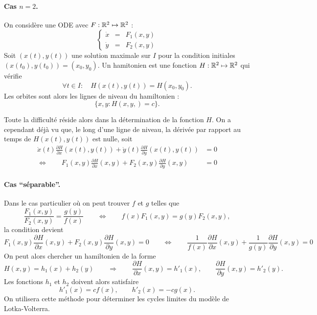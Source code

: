 \paragraph*{Cas $n = 2$.} 
On considère une ODE avec $F : \mathbb{R}^2 \mapsto \mathbb{R}^2$ : 
$$
\left\{\begin{array}{rcl} \dot x & = & F_1(x, y) \\ \dot y & = & F_2(x, y) \end{array}\right.
$$
Soit $(x(t), y(t))$ une solution maximale sur $I$ pour la condition initiales $(x(t_0), y(t_0)) = (x_0, y_0)$. Un hamitonien est une fonction $H : \mathbb{R}^2 \mapsto \mathbb{R}^2$ qui vérifie
$$
\forall t \in I: \quad H(x(t), y(t)) = H(x_0, y_0).
$$
Les orbites sont alors les lignes de niveau du hamiltonien : 
$$
\{x, y: H(x, y, ) = c\}.
$$

Toute la difficulté réside alors dans la détermination de la fonction $H$. On a cependant déjà vu que, le long d'une ligne de niveau, la dérivée par rapport au temps de $H(x(t), y(t))$ est nulle, soit
\begin{align*}
  \dot x(t) \frac{\partial H}{\partial x} (x(t), y(t)) +
  \dot y(t) \frac{\partial H}{\partial y} (x(t), y(t)) & = 0 \\
  \Leftrightarrow \qquad 
  F_1(x, y) \frac{\partial H}{\partial x} (x, y) +
  F_2(x, y) \frac{\partial H}{\partial y} (x, y) & = 0
\end{align*}

\paragraph*{Cas ``séparable''.} 
Dans le cas particulier où on peut trouver $f$ et $g$ telles que
$$
\frac{F_1(x, y)}{F_2(x, y)} = \frac{g(y)}{f(x)}
\qquad \Leftrightarrow \qquad 
f(x) F_1(x, y) = g(y) F_2(x, y),
$$
la condition devient
$$
F_1(x, y) \frac{\partial H}{\partial x} (x, y) +
F_2(x, y) \frac{\partial H}{\partial y} (x, y) = 0
\qquad \Leftrightarrow \qquad 
\frac1{f(x)} \frac{\partial H}{\partial x} (x, y) +
\frac1{g(y)} \frac{\partial H}{\partial y} (x, y) = 0
$$
On peut alors chercher un hamiltonien de la forme
$$
H(x, y) = h_1(x) + h_2(y)
\qquad \Rightarrow \qquad 
\frac{\partial H}{\partial x} (x, y) = h'_1(x), \qquad
\frac{\partial H}{\partial y} (x, y) = h'_2(y).
$$
Les fonctions $h_1$ et $h_2$ doivent alors satisfaire
$$
h'_1(x) = c f(x), \qquad
h'_2(x) = - c g(x).
$$
On utilisera cette méthode pour déterminer les cycles limites du modèle de Lotka-Volterra.
